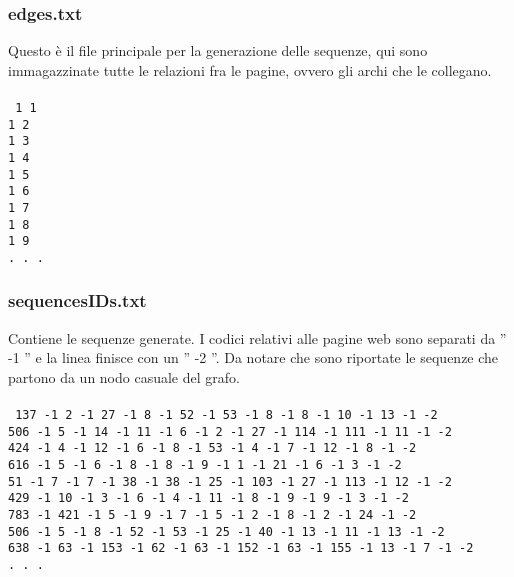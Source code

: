 \subsubsection{edges.txt}
Questo è il file principale per la generazione delle sequenze, qui sono immagazzinate tutte le relazioni fra le pagine, ovvero gli archi che le collegano. 
\\\\
\texttt{
1	1\\
1	2\\
1	3\\
1	4\\
1	5\\
1	6\\
1	7\\
1	8\\
1	9\\
. . .\\
}
\subsubsection{sequencesIDs.txt}
Contiene le sequenze generate. I codici relativi alle pagine web sono separati da '' -1 '' e la linea finisce con un '' -2 ''. Da notare che sono riportate le sequenze che partono da un nodo casuale del grafo.
\\\\
\texttt{
137 -1 2 -1 27 -1 8 -1 52 -1 53 -1 8 -1 8 -1 10 -1 13 -1 -2\\
506 -1 5 -1 14 -1 11 -1 6 -1 2 -1 27 -1 114 -1 111 -1 11 -1 -2\\
424 -1 4 -1 12 -1 6 -1 8 -1 53 -1 4 -1 7 -1 12 -1 8 -1 -2\\
616 -1 5 -1 6 -1 8 -1 8 -1 9 -1 1 -1 21 -1 6 -1 3 -1 -2\\
51 -1 7 -1 7 -1 38 -1 38 -1 25 -1 103 -1 27 -1 113 -1 12 -1 -2\\
429 -1 10 -1 3 -1 6 -1 4 -1 11 -1 8 -1 9 -1 9 -1 3 -1 -2\\
783 -1 421 -1 5 -1 9 -1 7 -1 5 -1 2 -1 8 -1 2 -1 24 -1 -2\\
506 -1 5 -1 8 -1 52 -1 53 -1 25 -1 40 -1 13 -1 11 -1 13 -1 -2\\
638 -1 63 -1 153 -1 62 -1 63 -1 152 -1 63 -1 155 -1 13 -1 7 -1 -2\\
. . .\\
}
